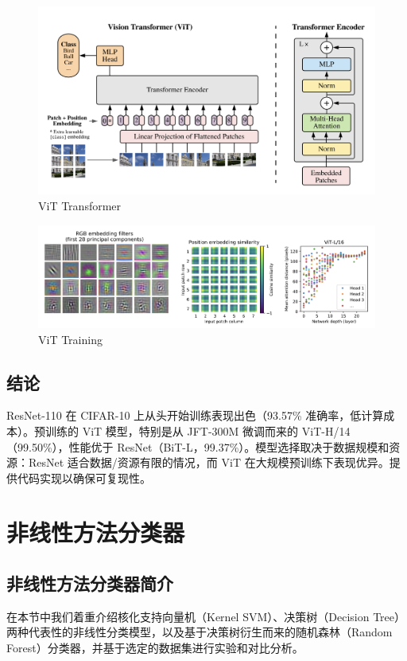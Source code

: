 \documentclass[UTF8]{report}
\theoremstyle{MyLineTheoremStyle} %
\theoremstyle{MyBlockTheoremStyle} %
\theoremstyle{MySubsubsectionStyle} %
\begin{document}
\begin{figure}[H]
    \centering
    \includegraphics[width=1.0\textwidth]{ViT1.png}
    \caption{ViT Transformer}
    \label{fig:vit_transformer}
\end{figure}

\begin{figure}[H]
    \centering
    \includegraphics[width=1.0\textwidth]{ViT2.png}
    \caption{ViT Training}
    \label{fig:vit_training}
\end{figure}


\section*{结论}
ResNet-110 在 CIFAR-10 上从头开始训练表现出色（93.57\% 准确率，低计算成本）。预训练的 ViT 模型，特别是从 JFT-300M 微调而来的 ViT-H/14（99.50\%），性能优于 ResNet（BiT-L，99.37\%）。模型选择取决于数据规模和资源：ResNet 适合数据/资源有限的情况，而 ViT 在大规模预训练下表现优异。提供代码实现以确保可复现性。




\chapter{非线性方法分类器}
\section{非线性方法分类器简介}
在本节中我们着重介绍核化支持向量机（Kernel SVM）、决策树（Decision Tree）两种代表性的非线性分类模型，以及基于决策树衍生而来的随机森林（Random Forest）分类器，并基于选定的数据集进行实验和对比分析。
\end{document}
